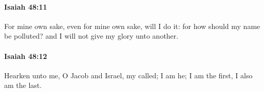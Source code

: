 		\paragraph{Isaiah 48:11} %
			\label{ISAIAH-48-11}

			For mine own sake, even for mine own sake, will I do it: for how should my name be polluted? and I will not give my glory unto another.


		\paragraph{Isaiah 48:12} %
			\label{ISAIAH-48-12}

			Hearken unto me, O Jacob and Israel, my called; I am he; I am the first, I also am the last.


